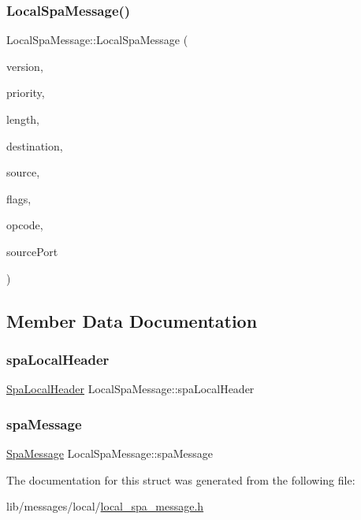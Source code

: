 \subsubsection{\texorpdfstring{Local\+Spa\+Message()}{LocalSpaMessage()}}
{\footnotesize\ttfamily Local\+Spa\+Message\+::\+Local\+Spa\+Message (\begin{DoxyParamCaption}\item[{uint8\+\_\+t}]{version,  }\item[{uint8\+\_\+t}]{priority,  }\item[{uint16\+\_\+t}]{length,  }\item[{\hyperlink{structLogicalAddress}{Logical\+Address}}]{destination,  }\item[{\hyperlink{structLogicalAddress}{Logical\+Address}}]{source,  }\item[{uint16\+\_\+t}]{flags,  }\item[{uint8\+\_\+t}]{opcode,  }\item[{uint16\+\_\+t}]{source\+Port }\end{DoxyParamCaption})\hspace{0.3cm}{\ttfamily [inline]}}



\subsection{Member Data Documentation}
\mbox{\label{structLocalSpaMessage_af8cc4ca1b9f7d7d993b563e0110e940a}} 
\subsubsection{\texorpdfstring{spa\+Local\+Header}{spaLocalHeader}}
{\footnotesize\ttfamily \hyperlink{structSpaLocalHeader}{Spa\+Local\+Header} Local\+Spa\+Message\+::spa\+Local\+Header}

\mbox{\label{structLocalSpaMessage_a87829228c5af1850fc3efc288cfbbdfc}} 
\subsubsection{\texorpdfstring{spa\+Message}{spaMessage}}
{\footnotesize\ttfamily \hyperlink{structSpaMessage}{Spa\+Message} Local\+Spa\+Message\+::spa\+Message}



The documentation for this struct was generated from the following file\+:\begin{DoxyCompactItemize}
\item 
lib/messages/local/\hyperlink{local__spa__message_8h}{local\+\_\+spa\+\_\+message.\+h}\end{DoxyCompactItemize}
